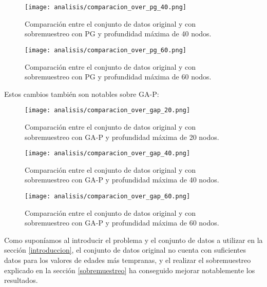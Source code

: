 \begin{figure}[H]
    \centering
	  \texttt{[image: analisis/comparacion\_over\_pg\_40.png]}
	  \caption{Comparación entre el conjunto de datos original y con sobremuestreo con PG y profundidad máxima de 40 nodos.}\label{fig:cmp_pg_over_40}

\end{figure}

\begin{figure}[H]
    \centering
	  \texttt{[image: analisis/comparacion\_over\_pg\_60.png]}
	  \caption{Comparación entre el conjunto de datos original y con sobremuestreo con PG y profundidad máxima de 60 nodos.}\label{fig:cmp_pg_over_60}

\end{figure}

Estos cambios también son notables sobre GA-P:

\begin{figure}[H]
    \centering
	  \texttt{[image: analisis/comparacion\_over\_gap\_20.png]}
	  \caption{Comparación entre el conjunto de datos original y con sobremuestreo con GA-P y profundidad máxima de 20 nodos.}\label{fig:cmp_gap_over_20}

\end{figure}

\begin{figure}[H]
    \centering
	  \texttt{[image: analisis/comparacion\_over\_gap\_40.png]}
	  \caption{Comparación entre el conjunto de datos original y con sobremuestreo con GA-P y profundidad máxima de 40 nodos.}\label{fig:cmp_gap_over_40}

\end{figure}

\begin{figure}[H]
    \centering
	  \texttt{[image: analisis/comparacion\_over\_gap\_60.png]}
	  \caption{Comparación entre el conjunto de datos original y con sobremuestreo con GA-P y profundidad máxima de 60 nodos.}\label{fig:cmp_gap_over_60}

\end{figure}

Como suponíamos al introducir el problema y el conjunto de datos a utilizar en la sección \ref{introduccion}, el conjunto de datos original no cuenta con suficientes datos para los valores de edades más tempranas, y el realizar el sobremuestreo explicado en la sección \ref{sobremuestreo} ha conseguido mejorar notablemente los resultados.

